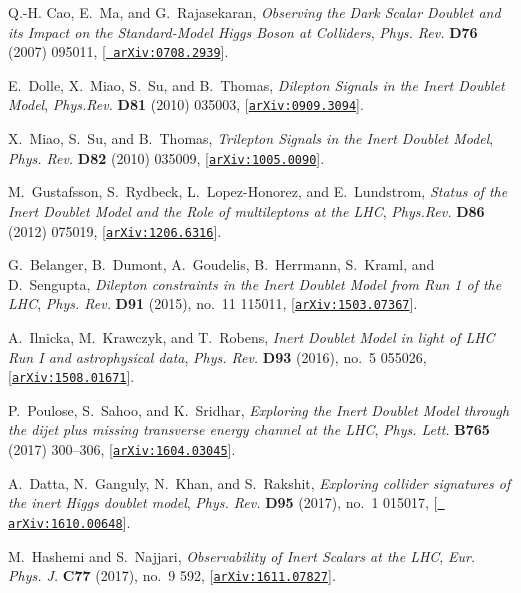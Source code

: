 \documentclass[a4paper, 11pt,notoc]{article}
\begin{document}
\begin{thebibliography}{100}
Q.-H. Cao, E.~Ma, and G.~Rajasekaran, {\it {Observing the Dark Scalar Doublet
  and its Impact on the Standard-Model Higgs Boson at Colliders}},  {\em Phys.
  Rev.} {\bf D76} (2007) 095011, [\href{http://arxiv.org/abs/0708.2939}{{\tt
  arXiv:0708.2939}}].

E.~Dolle, X.~Miao, S.~Su, and B.~Thomas, {\it {Dilepton Signals in the Inert
  Doublet Model}},  {\em Phys.Rev.} {\bf D81} (2010) 035003,
  [\href{http://arxiv.org/abs/0909.3094}{{\tt arXiv:0909.3094}}].

X.~Miao, S.~Su, and B.~Thomas, {\it {Trilepton Signals in the Inert Doublet
  Model}},  {\em Phys. Rev.} {\bf D82} (2010) 035009,
  [\href{http://arxiv.org/abs/1005.0090}{{\tt arXiv:1005.0090}}].

M.~Gustafsson, S.~Rydbeck, L.~Lopez-Honorez, and E.~Lundstrom, {\it {Status of
  the Inert Doublet Model and the Role of multileptons at the LHC}},  {\em
  Phys.Rev.} {\bf D86} (2012) 075019,
  [\href{http://arxiv.org/abs/1206.6316}{{\tt arXiv:1206.6316}}].

G.~Belanger, B.~Dumont, A.~Goudelis, B.~Herrmann, S.~Kraml, and D.~Sengupta,
  {\it {Dilepton constraints in the Inert Doublet Model from Run 1 of the
  LHC}},  {\em Phys. Rev.} {\bf D91} (2015), no.~11 115011,
  [\href{http://arxiv.org/abs/1503.07367}{{\tt arXiv:1503.07367}}].

A.~Ilnicka, M.~Krawczyk, and T.~Robens, {\it {Inert Doublet Model in light of
  LHC Run I and astrophysical data}},  {\em Phys. Rev.} {\bf D93} (2016), no.~5
  055026, [\href{http://arxiv.org/abs/1508.01671}{{\tt arXiv:1508.01671}}].

P.~Poulose, S.~Sahoo, and K.~Sridhar, {\it {Exploring the Inert Doublet Model
  through the dijet plus missing transverse energy channel at the LHC}},  {\em
  Phys. Lett.} {\bf B765} (2017) 300--306,
  [\href{http://arxiv.org/abs/1604.03045}{{\tt arXiv:1604.03045}}].

A.~Datta, N.~Ganguly, N.~Khan, and S.~Rakshit, {\it {Exploring collider
  signatures of the inert Higgs doublet model}},  {\em Phys. Rev.} {\bf D95}
  (2017), no.~1 015017, [\href{http://arxiv.org/abs/1610.00648}{{\tt
  arXiv:1610.00648}}].

M.~Hashemi and S.~Najjari, {\it {Observability of Inert Scalars at the LHC}},
  {\em Eur. Phys. J.} {\bf C77} (2017), no.~9 592,
  [\href{http://arxiv.org/abs/1611.07827}{{\tt arXiv:1611.07827}}].


\end{thebibliography}
\end{document}
